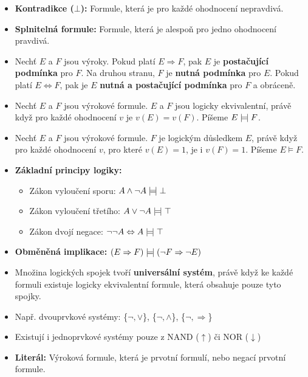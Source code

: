 \begin{itemize}
	\item \textbf{Kontradikce ($\bot$):} Formule, která je pro každé ohodnocení nepravdivá.

	\item \textbf{Splnitelná formule:} Formule, která je alespoň pro jedno ohodnocení pravdivá.

	\item Nechť $E$ a $F$ jsou výroky. Pokud platí $E \Rightarrow F$, pak $E$ je \textbf{postačující podmínka} pro $F$. Na druhou stranu, $F$ je \textbf{nutná podmínka} pro $E$. Pokud platí $E \Leftrightarrow F$, pak je $E$ \textbf{nutná a postačující podmínka} pro $F$ a obráceně.

	\item Nechť $E$ a $F$ jsou výrokové formule. $E$ a $F$ jsou logicky ekvivalentní, právě když pro každé ohodnocení $v$ je $v(E) = v(F)$. Píšeme $E \models\!\mid F$.

	\item Nechť $E$ a $F$ jsou výrokové formule. $F$ je logickým důsledkem $E$, právě když pro každé ohodnocení $v$, pro které $v(E) = 1$, je i $v(F) = 1$. Píšeme $E \models F$.

	\item \textbf{Základní principy logiky:}
	\begin{itemize}
		\item Zákon vyloučení sporu: $A \land \neg A \models\!\mid \bot$
		\item Zákon vyloučení třetího: $A \lor \neg A \models\!\mid \top$
		\item Zákon dvojí negace: $\neg\neg A \Leftrightarrow A \models\!\mid \top$
	\end{itemize}

	\item \textbf{Obměněná implikace:} $(E \Rightarrow F) \models\!\mid (\neg F \Rightarrow \neg E)$

	\item Množina logických spojek tvoří \textbf{universální systém}, právě když ke každé formuli existuje logicky ekvivalentní formule, která obsahuje pouze tyto spojky.

	\item Např. dvouprvkové systémy: \{$\neg,\lor$\}, \{$\neg,\land$\}, \{$\neg,\Rightarrow$\}

	\item Existují i jednoprvkové systémy pouze z NAND ($\uparrow$) či NOR ($\downarrow$)

	\item \textbf{Literál:} Výroková formule, která je prvotní formulí, nebo negací prvotní formule.


\end{itemize}
